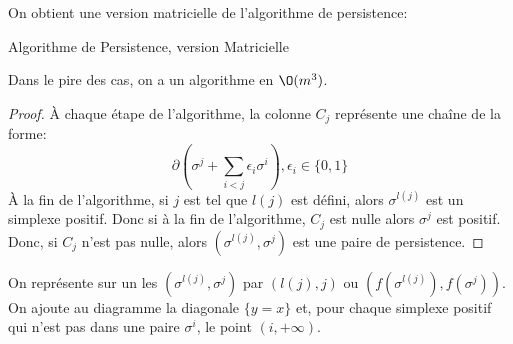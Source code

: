 On obtient une version matricielle de l'algorithme de persistence:
\begin{algorithm}
	\caption{Algorithme de Persistence, version Matricielle}
	\label{alg:persistence_mat}
	\begin{algorithmic}
		\EndInput
		\EndWhile
		\EndFor
	\end{algorithmic}
\end{algorithm}

Dans le pire des cas, on a un algorithme en $\O(m^{3})$.

\begin{proof}
	À chaque étape de l'algorithme, la colonne $C_{j}$ représente une chaîne de la forme:
	\begin{equation*}
		\partial \left(\sigma^{j} + \sum_{i < j} \epsilon_{i}\sigma^{i}\right), \epsilon_{i}\in \{0, 1\}
	\end{equation*}
	À la fin de l'algorithme, si $j$ est tel que $l(j)$ est défini, alors $\sigma^{l(j)}$ est un simplexe positif.
	Donc si à la fin de l'algorithme, $C_{j}$ est nulle alors $\sigma^{j}$ est positif.
	Donc, si $C_{j}$ n'est pas nulle, alors $(\sigma^{l(j)}, \sigma^{j})$ est une paire de persistence.
\end{proof}

\begin{definition}
	On représente sur un  les  $\left(\sigma^{l(j)}, \sigma^{j}\right)$ par $\left(l\left(j\right), j\right)$ ou $\left(f\left(\sigma^{l(j)}\right), f\left(\sigma^{j}\right)\right)$.
	On ajoute au diagramme la diagonale $\{y = x\}$ et, pour chaque simplexe positif qui n'est pas dans une paire $\sigma^{i}$, le point $(i, + \infty)$.
\end{definition}


